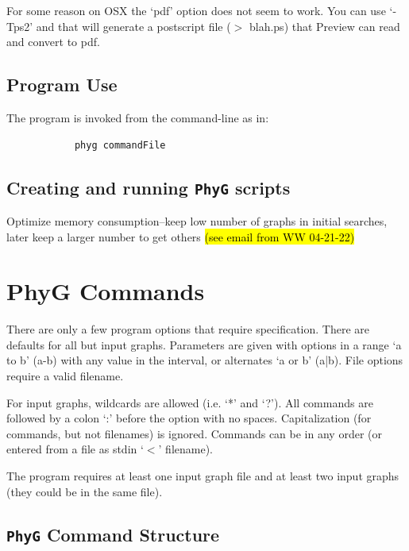 \documentclass[11pt]{book}
\newcommand{\phyg}{\texttt{PhyG} }
\begin{document}
{{	For some reason on OSX the `pdf' option does not seem to work.  You can use `-Tps2' and that will generate 
	a postscript file ($>$ blah.ps) that Preview can read and convert to pdf.
	
\section{Program Use}
	The program is invoked from the command-line as in:
	
		\begin{verbatim}
			phyg commandFile
		\end{verbatim}	
	
\section{Creating and running \phyg scripts}
	Optimize memory consumption--keep low number of graphs in initial searches, later keep a larger
	number to get others \hl{(see email from WW 04-21-22)}

	
\chapter{PhyG Commands}
	There are only a few program options that require specification.  There are defaults for all but input
	graphs.  Parameters are given with options in a range `a to b' (a-b) with any value in the interval, or
	alternates `a or b' (a|b). File options require a valid filename.
	
	For input graphs, wildcards are allowed (i.e. `*' and `?').  All commands are followed by a colon `:' 
	before the option with no spaces.  
	Capitalization (for commands, but not filenames) is ignored.  Commands can be in any order 
	(or entered from a file as stdin `$<$' filename).
	
	The program requires at least one input graph file and at least two input graphs (they could be in the same file).

\section{\phyg Command Structure}
		
}}
\end{document}
